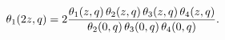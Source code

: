 \[\mathop{\theta_{1}\/}\nolimits\!\left(2z,q\right)=2\frac{\mathop{\theta_{1}\/}%
\nolimits\!\left(z,q\right)\mathop{\theta_{2}\/}\nolimits\!\left(z,q\right)%
\mathop{\theta_{3}\/}\nolimits\!\left(z,q\right)\mathop{\theta_{4}\/}\nolimits%
\!\left(z,q\right)}{\mathop{\theta_{2}\/}\nolimits\!\left(0,q\right)\mathop{%
\theta_{3}\/}\nolimits\!\left(0,q\right)\mathop{\theta_{4}\/}\nolimits\!\left(%
0,q\right)}.\]